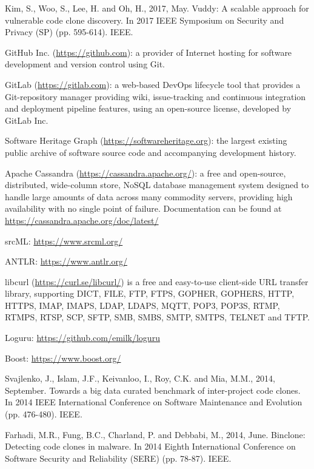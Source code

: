 \documentclass{article}
\begin{document}
\clearpage
\begin{thebibliography}{10}

Kim, S., Woo, S., Lee, H. and Oh, H., 2017, May. Vuddy: A scalable approach for vulnerable code clone discovery. In 2017 IEEE Symposium on Security and Privacy (SP) (pp. 595-614). IEEE.

GitHub Inc. (\url{https://github.com}): a provider of Internet hosting for software development and version control using Git.

GitLab (\url{https://gitlab.com}): a web-based DevOps lifecycle tool that provides a Git-repository manager providing wiki, issue-tracking and continuous integration and deployment pipeline features, using an open-source license, developed by GitLab Inc.

Software Heritage Graph (\url{https://softwareheritage.org}): the largest existing public archive of software source code and accompanying development history. 

Apache Cassandra (\url{https://cassandra.apache.org/}): a free and open-source, distributed, wide-column store, NoSQL database management system designed to handle large amounts of data across many commodity servers, providing high availability with no single point of failure. Documentation can be found at  \url{https://cassandra.apache.org/doc/latest/}

srcML: \url{https://www.srcml.org/}

ANTLR: \url{https://www.antlr.org/}

libcurl (\url{https://curl.se/libcurl/}) is a free and easy-to-use client-side URL transfer library, supporting DICT, FILE, FTP, FTPS, GOPHER, GOPHERS, HTTP, HTTPS, IMAP, IMAPS, LDAP, LDAPS, MQTT, POP3, POP3S, RTMP, RTMPS, RTSP, SCP, SFTP, SMB, SMBS, SMTP, SMTPS, TELNET and TFTP.

Loguru: \url{https://github.com/emilk/loguru}

Boost: \url{https://www.boost.org/}

Svajlenko, J., Islam, J.F., Keivanloo, I., Roy, C.K. and Mia, M.M., 2014, September. Towards a big data curated benchmark of inter-project code clones. In 2014 IEEE International Conference on Software Maintenance and Evolution (pp. 476-480). IEEE.

Farhadi, M.R., Fung, B.C., Charland, P. and Debbabi, M., 2014, June. Binclone: Detecting code clones in malware. In 2014 Eighth International Conference on Software Security and Reliability (SERE) (pp. 78-87). IEEE.

\end{thebibliography}
\end{document}
